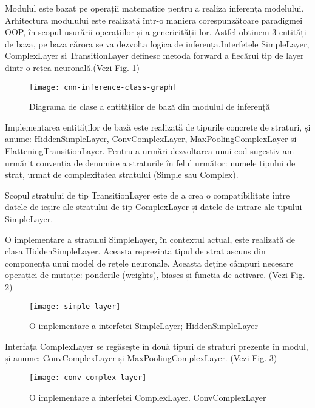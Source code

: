 	\newpage
	
	Modulul este bazat pe operații matematice pentru a realiza inferența modelului. Arhitectura modulului este realizată într-o maniera corespunzătoare paradigmei OOP, în scopul usurării operațiilor și a genericității lor. Astfel obtinem 3 entități de baza, pe baza cărora se va dezvolta logica de inferența.Interfetele SimpleLayer, ComplexLayer si TransitionLayer definesc metoda forward a fiecărui tip de layer dintr-o rețea neuronală.(Vezi Fig. \ref{fig:layers-architecture})
	
	
	\begin{figure}[H]
		\texttt{[image: cnn-inference-class-graph]}
		\caption{\label{fig:layers-architecture} Diagrama de clase a entităților de bază din modulul de inferență}
	\end{figure}

	Implementarea entităților de bază este realizată de tipurile concrete de straturi, și anume: HiddenSimpleLayer, ConvComplexLayer, MaxPoolingComplexLayer și FlatteningTransitionLayer. Pentru a urmări dezvoltarea unui cod sugestiv am urmărit convenția de denumire a straturile în felul următor: numele tipului de strat, urmat de complexitatea stratului (Simple sau Complex).
	
	Scopul stratului de tip TransitionLayer este de a crea o compatibilitate între datele de ieșire ale stratului de tip ComplexLayer și datele de intrare ale tipului SimpleLayer. 
	
	O implementare a stratului SimpleLayer, în contextul actual, este realizată de clasa HiddenSimpleLayer. Aceasta reprezintă tipul de strat ascuns din componența unui model de rețele neuronale. Aceasta deține câmpuri necesare operației de mutație: ponderile (weights), biases și funcția de activare. (Vezi Fig. \ref{fig:simple-layer})
	
	
	\begin{figure}[H]
		\texttt{[image: simple-layer]}
		\caption{\label{fig:simple-layer} O implementare a interfeței SimpleLayer; HiddenSimpleLayer}
	\end{figure}

	\vfill


	Interfața ComplexLayer se regăsește în două tipuri de straturi prezente în modul, și anume: ConvComplexLayer și MaxPoolingComplexLayer. (Vezi Fig. \ref{fig:complex-layer})
	
		\begin{figure}[H]
		\texttt{[image: conv-complex-layer]}
		\caption{\label{fig:complex-layer} O implementare a interfeței ComplexLayer. ConvComplexLayer}
	\end{figure}

